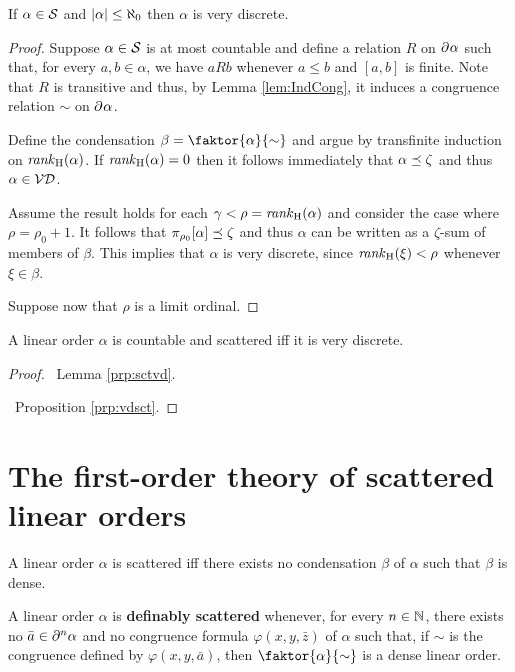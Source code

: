 \begin{lem}\label{prp:sctvd}
	If $\alpha\in\mathcal{S}$ and $\left\lvert\alpha\right\rvert\leq\aleph_0$ then $\alpha$ is very discrete.
\end{lem}
\begin{proof}
	Suppose $\alpha\in\mathcal{S}$ is at most countable and define a relation $R$
	on $\partial^{}\alpha$ such that, for every $a,b\in\alpha$, we have $aRb$
	whenever $a\leq b$ and $[a,b]$ is finite.  Note that $R$ is transitive and
	thus, by Lemma \ref{lem:IndCong}, it induces a congruence relation $\sim$ on
	$\partial^{}\alpha$.

	Define the condensation $\beta=\faktor{\alpha}{\sim}$ and argue by
	transfinite induction on $\mathit{rank}_\mathrm{H}(\alpha)$.  If $\mathit{rank}_\mathrm{H}(\alpha)=0$ then it
	follows immediately that $\alpha\preceq\zeta$ and thus $\alpha\in\mathcal{VD}$.

	Assume the result holds for each $\gamma<\rho=\mathit{rank}_\mathrm{H}(\alpha)$ and consider
	the case where $\rho=\rho_0+1$.  It follows that
	$\pi_{\rho_0}[\alpha]\preceq\zeta$ and thus $\alpha$ can be written as a
	$\zeta$-sum of members of $\beta$.  This implies that $\alpha$ is very
	discrete, since $\mathit{rank}_\mathrm{H}(\xi)<\rho$ whenever $\xi\in\beta$.

	Suppose now that $\rho$ is a limit ordinal.
\end{proof}

\begin{thm}
	A linear order $\alpha$ is countable and scattered iff it is very discrete.
\end{thm}
\begin{proof}

	\forward\	Lemma \ref{prp:sctvd}.

	\backward\	Proposition \ref{prp:vdsct}.
\end{proof}


\section{The first-order theory of scattered linear orders}


\begin{prp}
        A linear order $\alpha$ is scattered iff there exists no condensation $\beta$ of $\alpha$ such that $\beta$ is dense.
    \end{prp}

    \begin{dfn}
	    A linear order $\alpha$ is \textbf{definably scattered} whenever, for every $n\in\mathbb{N}$, there exists no $\bar{a}\in\partial^{n}\alpha$ and no congruence formula $\varphi(x,y,\bar{z})$ of $\alpha$ such that, if $\sim$ is the congruence defined by $\varphi(x,y,\bar{a})$, then $\faktor{\alpha}{\sim}$ is a dense linear order.
    \end{dfn}

